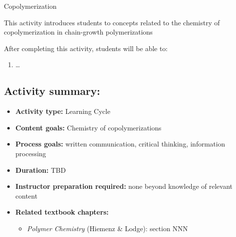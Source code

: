 %
%
%
%

\renewcommand{\figpath}{content/polymchem/copolymers/copolym/figs}
\renewcommand{\labelbase}{copolym}

\begin{activity}{Copolymerization}

\begin{instructornotes}
	This activity introduces students to concepts related to the chemistry of copolymerization in chain-growth polymerizations
	
	After completing this activity, students will be able to:
	\begin{enumerate}
		\item \dots
	\end{enumerate}
	
	\subsection*{Activity summary:}
	\begin{itemize}
		\item \textbf{Activity type:} Learning Cycle
		\item \textbf{Content goals:} Chemistry of copolymerizations
		\item \textbf{Process goals:} %
			written communication, critical thinking, information processing
		\item \textbf{Duration:} TBD
		\item \textbf{Instructor preparation required:} none beyond knowledge of relevant content
		\item \textbf{Related textbook chapters:}
			\begin{itemize}
				\item \emph{Polymer Chemistry} (Hiemenz \& Lodge): section NNN
			\end{itemize}
	\end{itemize}
	

\end{instructornotes}
\end{activity}
